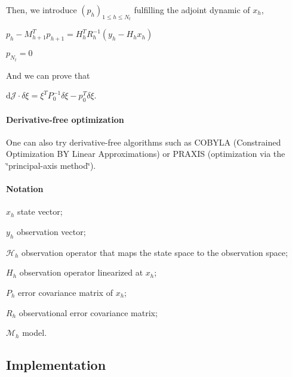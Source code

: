 \documentclass{tufte-book}
\begin{document}
\-Then, we introduce $ (p_h)_{1 \le h \le N_t}$ fulfilling the adjoint dynamic of $ x_h $,

\begin{center} $ p_h - M_{h+1}^T p_{h+1} = H_h^T R_h^{-1} (y_h - H_h x_h)$\end{center}
\begin{center} $ p_{N_t} = 0 $ \end{center}

\-And we can prove that \begin{center} $ \mathrm{d} \mathcal{J}\cdot\delta \xi = \xi^T P_0^{-1} \delta \xi - p_0^T \delta \xi $. \end{center}

 \hypertarget{four_dimensional_variational_algorithm4dv1}{}\paragraph{\-Derivative-\/free optimization}\label{four_dimensional_variational_algorithm4dv1}

\-One can also try derivative-\/free algorithms such as \-C\-O\-B\-Y\-L\-A (\-Constrained \-Optimization \-B\-Y \-Linear \-Approximations) or \-P\-R\-A\-X\-I\-S (optimization via the \char`\"{}principal-\/axis method\char`\"{}).


\hypertarget{four_dimensional_variational_algorithm4dvnotation}{}\paragraph{\-Notation}\label{four_dimensional_variational_algorithm4dvnotation}

 $x_h$ state vector; \par
 $y_h$ observation vector; \par
 $\mathcal{H}_h$ observation operator that maps the state space to the observation space; \par
 $H_h$ observation operator linearized at $x_h$; \par
 $P_h$ error covariance matrix of $x_h$; \par
 $R_h$ observational error covariance matrix; \par
 $\mathcal{M}_h$ model.


\hypertarget{four_dimensional_variational_implementation}{}\subsection{\-Implementation}\label{four_dimensional_variational_implementation}
\end{document}
